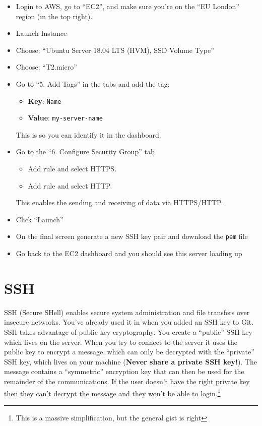 \begin{itemize}
    \item Login to AWS, go to ``EC2'', and make sure you're on the ``EU London'' region (in the top right).
    \item Launch Instance
    \item Choose: ``Ubuntu Server 18.04 LTS (HVM), SSD Volume Type''
    \item Choose: ``T2.micro''
    \item Go to ``5. Add Tags'' in the tabs and add the tag:
        \begin{itemize}
            \item \textbf{Key}: \texttt{Name}
            \item \textbf{Value}: \texttt{my-server-name}
        \end{itemize}
        This is so you can identify it in the dashboard.

    \item Go to the ``6. Configure Security Group'' tab
        \begin{itemize}
            \item Add rule and select HTTPS.
            \item Add rule and select HTTP.
        \end{itemize}
         This enables the sending and receiving of data via HTTPS/HTTP.
    \item Click ``Launch''
    \item On the final screen generate a new SSH key pair and download the \texttt{pem} file
    \item Go back to the EC2 dashboard and you should see this server loading up
\end{itemize}


\section{SSH}

SSH (Secure SHell) enables secure system administration and file transfers over insecure networks. You've already used it in when you added an SSH key to Git.
\\

SSH takes advantage of public-key cryptography. You create a ``public'' SSH key which lives on the server. When you try to connect to the server it uses the public key to encrypt a message, which can only be decrypted with the ``private'' SSH key, which lives on your machine (\textbf{Never share a private SSH key!}). The message contains a ``symmetric'' encryption key that can then be used for the remainder of the communications. If the user doesn't have the right private key then they can't decrypt the message and they won't be able to login.\footnote{This is a massive simplification, but the general gist is right}
\\

